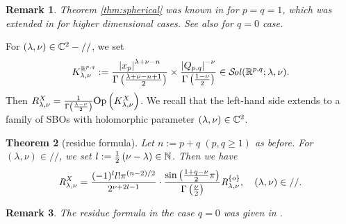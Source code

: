 \documentclass[reqno,12pt]{pja00} %
\newtheorem{theorem}{Theorem}
\newcommand{\sol}{\mathcal{S}\!{\it ol}(\R^{p,q};\lambda,\nu)}
\newtheorem{remark}[theorem]{Remark}
\theoremstyle{definition}
\theoremstyle{exampstyle} \newtheorem{examp}[theorem]{Theorem}
\newcommand{\Op}{\mbox{\normalfont Op}}
\newcommand{\OpR}{\mbox{\it R}}
\renewcommand{\Q}{Q_{p,q}}
\renewcommand{\setminus}{-}
\begin{document}
\begin{remark}
	Theorem \ref{thm:spherical} was known in \cite[Lem. A.5]{bernstein2004estimates} for $p=q=1$, which was extended in \cite[Thm. 1.1]{clerc2011generalized} for higher dimensional cases.
	See also \cite[Prop.\ 7.4]{kobayashi2015symmetry} for $q=0$ case.
\end{remark}
For $(\lambda,\nu)\in\C^2\setminus//$, we set 
\[K_{\lambda,\nu}^{\mathbb{R}^{p,q}}:=\frac{\myabs{x_p}^{\lambda+\nu-n}}{\Gamma\left( \frac{\lambda+\nu-n+1}{2} \right)}\times
\frac{\myabs{\Q}^{-\nu}}{\Gamma\left( \frac{1-\nu}{2} \right)}\in\sol.\]
Then $R_{\lambda,\nu}^X=\frac{1}{\Gamma\left( \frac{\lambda-\nu}{2} \right)}\Op\left( K_{\lambda,\nu}^X \right)$. We recall that the left-hand side extends to a family of SBOs with holomorphic
parameter $(\lambda,\nu)\in\mathbb{C}^2$.
\begin{theorem}[residue formula]
	Let $n:=p+q\;(p,q\ge1)$ as before.
	For $(\lambda,\nu)\in//$, we set $l:=\frac{1}{2}\left( \nu-\lambda \right)\in\mathbb{N}$. Then we have
  \[\OpR_{\lambda,\nu}^X  = \frac{ (- 1)^l l!\pi^{(n - 2) / 2} 
		}{2^{ \nu + 2 l-1}}\cdot  \frac{\sin\left( \frac{1+q-\nu}{2}\pi \right)}{\Gamma\left( \frac{\nu}{2} \right)}
     \OpR_{\lambda,\nu}^{ \left\{ o \right\} },\quad(\lambda,\nu)\in// . \]
	\end{theorem}
	\begin{remark}
		The residue formula in the case $q=0$ was given in \cite[Thm. 12.2]{kobayashi2015symmetry}.
	\end{remark}
\end{document}
